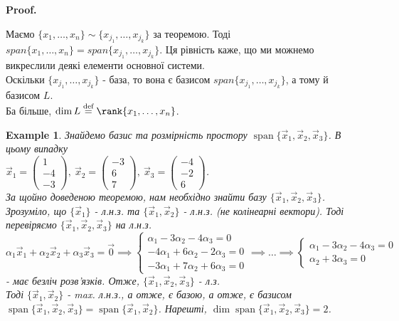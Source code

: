 \documentclass[a4paper, 10pt]{article}
\makeatletter
\theoremstyle{theoremdd}
\newtheorem{example}[theorem]{Example}
\DeclareMathOperator{\linspan}{span}
\renewenvironment{proof}[1][Proof.\\]{\par
\pushQED{\hfill \qed}%
\normalfont \topsep6\p@\@plus6\p@\relax
\trivlist
\item\relax
{\bfseries
#1\@addpunct{.}}\hspace\labelsep\ignorespaces
}{%
\popQED\endtrivlist\@endpefalse
}
\makeatother
\begin{document}
	\begin{proof}
	Маємо $\{x_1,\dots,x_n\} \sim \{x_{j_1},\dots,x_{j_k}\}$ за теоремою. Тоді $span \{x_1,\dots,x_n\} = span \{ x_{j_1},\dots,x_{j_k} \}$. Ця рівність каже, що ми можнемо викреслили деякі елементи основної системи.\\
	Оскільки $\{x_{j_1},\dots,x_{j_k}\}$ - база, то вона є базисом $span \{ x_{j_1},\dots,x_{j_k} \}$, а тому й базисом $L$.\\
	Ба більше, $\dim L \overset{\text{def}}{=} \rank \{x_1,\dots,x_n\}$.
	\end{proof}
	\fi
	
	\begin{example}
	Знайдемо базис та розмірність простору $\linspan \{ \vec{x}_1, \vec{x}_2, \vec{x}_3 \}$. В цьому випадку\\
	$\vec{x}_1 = \begin{pmatrix}
	1 \\ -4 \\ -3
	\end{pmatrix},\ \vec{x}_2 = \begin{pmatrix}
	-3 \\ 6 \\ 7
	\end{pmatrix},\ \vec{x}_3 = \begin{pmatrix}
	-4 \\ -2 \\ 6
	\end{pmatrix}$.\\
	За щойно доведеною теоремою, нам необхідно знайти базу $\{\vec{x}_1,\vec{x}_2,\vec{x}_3 \}$. Зрозуміло, що $\{\vec{x}_1\}$ - л.н.з. та $\{\vec{x}_1, \vec{x}_2\}$ - л.н.з. (не колінеарні вектори). Тоді перевіряємо $\{\vec{x}_1,\vec{x}_2,\vec{x}_3 \}$ на л.н.з.\\
	$\alpha_1 \vec{x}_1 + \alpha_2 \vec{x}_2 + \alpha_3 \vec{x}_3 = \vec{0} \implies 		\begin{cases}
	\alpha_1 - 3 \alpha_2 - 4 \alpha_3 = 0 \\
	-4\alpha_1 + 6 \alpha_2 - 2 \alpha_3 = 0 \\
	-3\alpha_1 + 7 \alpha_2 + 6 \alpha_3 = 0
	\end{cases} \implies \dots \implies \begin{cases} \alpha_1 - 3 \alpha_2 - 4 \alpha_3 = 0 \\ \alpha_2 + 3 \alpha_3 = 0 \end{cases}$ - має безліч розв'язків. Отже, $\{\vec{x}_1,\vec{x}_2,\vec{x}_3\}$ - л.з.\\
	Тоді $\{\vec{x}_1,\vec{x}_2\}$ - max. л.н.з., а отже, є базою, а отже, є базисом $\linspan \{\vec{x}_1,\vec{x}_2,\vec{x}_3 \} = \linspan \{\vec{x}_1,\vec{x}_2 \}$. Нарешті, $\dim \linspan \{\vec{x}_1,\vec{x}_2,\vec{x}_3\} = 2$.
	\end{example}
	
\end{document}
